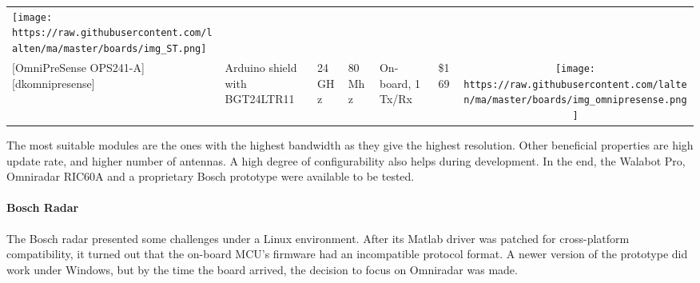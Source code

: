 \begin{longtable}[]{@{}llllllc@{}}
\begin{minipage}[t]{0.10\columnwidth}
\texttt{[image: https://raw.githubusercontent.com/lalten/ma/master/boards/img\_ST.png]}\strut
\end{minipage}\tabularnewline
\begin{minipage}[t]{0.09\columnwidth}\raggedright\strut
{[}OmniPreSense OPS241-A{]}{[}dkomnipresense{]}\strut
\end{minipage} & \begin{minipage}[t]{0.13\columnwidth}\raggedright\strut
Arduino shield with BGT24LTR11\strut
\end{minipage} & \begin{minipage}[t]{0.09\columnwidth}\raggedright\strut
24GHz\strut
\end{minipage} & \begin{minipage}[t]{0.11\columnwidth}\raggedright\strut
80Mhz\strut
\end{minipage} & \begin{minipage}[t]{0.10\columnwidth}\raggedright\strut
On-board, 1 Tx/Rx\strut
\end{minipage} & \begin{minipage}[t]{0.15\columnwidth}\raggedright\strut
\$169\strut
\end{minipage} & \begin{minipage}[t]{0.10\columnwidth}\centering\strut
\texttt{[image: https://raw.githubusercontent.com/lalten/ma/master/boards/img\_omnipresense.png]}\strut
\end{minipage}\tabularnewline
\bottomrule
\end{longtable}

The most suitable modules are the ones with the highest bandwidth as
they give the highest resolution. Other beneficial properties are high
update rate, and higher number of antennas. A high degree of
configurability also helps during development. In the end, the Walabot
Pro, Omniradar RIC60A and a proprietary Bosch prototype were available
to be tested.

\paragraph{Bosch Radar}\label{bosch-radar}

The Bosch radar presented some challenges under a Linux environment.
After its Matlab driver was patched for cross-platform compatibility, it
turned out that the on-board MCU's firmware had an incompatible protocol
format. A newer version of the prototype did work under Windows, but by
the time the board arrived, the decision to focus on Omniradar was made.

